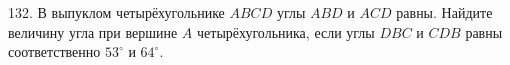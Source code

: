 132. В выпуклом четырёхугольнике $ABCD$ углы $ABD$ и $ACD$ равны. Найдите величину угла при вершине $A$ четырёхугольника, если углы $DBC$ и $CDB$ равны соответственно $53^\circ$ и $64^\circ.$\\
